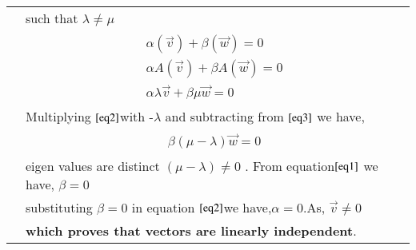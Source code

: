 \documentclass[journal,12pt]{IEEEtran}
\begin{document}
\begin{longtable}{|l|l|}
& such that $\lambda\neq\mu$\\
 &\parbox{12cm}{\begin{align}
    \alpha(\vec{v})+\beta(\vec{w})=0\label{eq2}\\
     \alpha A(\vec{v})+\beta A(\vec{w})=0\\
     \alpha \lambda\vec{v}+\beta\mu\vec{w}=0\label{eq3}
     \end{align}}\\
     & Multiplying $\eqref{eq2}$with -$\lambda$ and subtracting from $\eqref{eq3}$ we have,\\
   & \parbox{12cm}{\begin{align}  
  \beta(\mu-\lambda)\vec{w}=0 \label{eq1}
  \end{align}}\\
  & eigen values are distinct $(\mu-\lambda)\neq 0$ .
  From equation$\eqref{eq1}$ we have, $\beta=0$\\
  & substituting $\beta=0$ in  equation $\eqref{eq2}$we have,$\alpha=0$.As, $\vec{v}\neq 0$\\
  & \textbf{which proves that vectors are linearly independent}.\\
  

\end{longtable}
\end{document}
